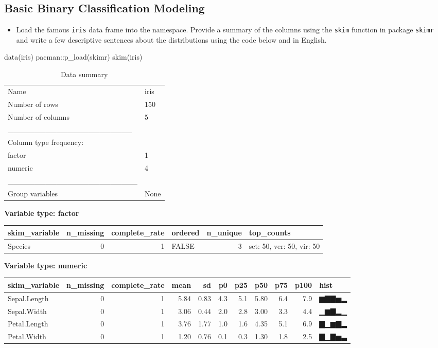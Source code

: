 \documentclass[
]{article}
\newenvironment{Shaded}{\begin{snugshade}}{\end{snugshade}}
\newcommand{\FunctionTok}[1]{\textcolor[rgb]{0.00,0.00,0.00}{#1}}
\newcommand{\NormalTok}[1]{#1}
\newcommand{\SpecialCharTok}[1]{\textcolor[rgb]{0.00,0.00,0.00}{#1}}
\providecommand{\tightlist}{%
  \setlength{\itemsep}{0pt}\setlength{\parskip}{0pt}}
\begin{document}
\hypertarget{basic-binary-classification-modeling}{%
\subsection{Basic Binary Classification
Modeling}\label{basic-binary-classification-modeling}}

\begin{itemize}
\tightlist
\item
  Load the famous \texttt{iris} data frame into the namespace. Provide a
  summary of the columns using the \texttt{skim} function in package
  \texttt{skimr} and write a few descriptive sentences about the
  distributions using the code below and in English.
\end{itemize}

\begin{Shaded}
\begin{Highlighting}[]
\FunctionTok{data}\NormalTok{(iris)}
\NormalTok{pacman}\SpecialCharTok{::}\FunctionTok{p\_load}\NormalTok{(skimr)}
\FunctionTok{skim}\NormalTok{(iris)}
\end{Highlighting}
\end{Shaded}

\begin{longtable}[]{@{}ll@{}}
\caption{Data summary}\tabularnewline
\toprule
\endhead
Name & iris\tabularnewline
Number of rows & 150\tabularnewline
Number of columns & 5\tabularnewline
\_\_\_\_\_\_\_\_\_\_\_\_\_\_\_\_\_\_\_\_\_\_\_ &\tabularnewline
Column type frequency: &\tabularnewline
factor & 1\tabularnewline
numeric & 4\tabularnewline
\_\_\_\_\_\_\_\_\_\_\_\_\_\_\_\_\_\_\_\_\_\_\_\_ &\tabularnewline
Group variables & None\tabularnewline
\bottomrule
\end{longtable}

\textbf{Variable type: factor}

\begin{longtable}[]{@{}lrrlrl@{}}
\toprule
skim\_variable & n\_missing & complete\_rate & ordered & n\_unique &
top\_counts\tabularnewline
\midrule
\endhead
Species & 0 & 1 & FALSE & 3 & set: 50, ver: 50, vir: 50\tabularnewline
\bottomrule
\end{longtable}

\textbf{Variable type: numeric}

\begin{longtable}[]{@{}lrrrrrrrrrl@{}}
\toprule
skim\_variable & n\_missing & complete\_rate & mean & sd & p0 & p25 &
p50 & p75 & p100 & hist\tabularnewline
\midrule
\endhead
Sepal.Length & 0 & 1 & 5.84 & 0.83 & 4.3 & 5.1 & 5.80 & 6.4 & 7.9 &
▆▇▇▅▂\tabularnewline
Sepal.Width & 0 & 1 & 3.06 & 0.44 & 2.0 & 2.8 & 3.00 & 3.3 & 4.4 &
▁▆▇▂▁\tabularnewline
Petal.Length & 0 & 1 & 3.76 & 1.77 & 1.0 & 1.6 & 4.35 & 5.1 & 6.9 &
▇▁▆▇▂\tabularnewline
Petal.Width & 0 & 1 & 1.20 & 0.76 & 0.1 & 0.3 & 1.30 & 1.8 & 2.5 &
▇▁▇▅▃\tabularnewline
\bottomrule
\end{longtable}
\end{document}
